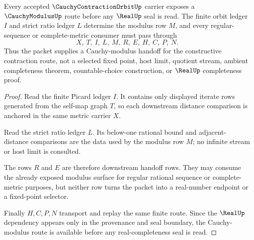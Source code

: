\begin{theorem}
\label{thm:cauchy-contraction-orbit-cauchy-modulus-handoff}
Every accepted $\CauchyContractionOrbitUp$ carrier exposes a $\CauchyModulusUp$ route before any $\RealUp$ seal is read. The finite orbit ledger $I$ and strict ratio ledger $L$ determine the modulus row $M$, and every regular-sequence or complete-metric consumer must pass through
$$
X,\ T,\ I,\ L,\ M,\ R,\ E,\ H,\ C,\ P,\ N.
$$
Thus the packet supplies a Cauchy-modulus handoff for the constructive contraction route, not a selected fixed point, host limit, quotient stream, ambient completeness theorem, countable-choice construction, or $\RealUp$ completeness proof.
\end{theorem}
\begin{proof}
Read the finite Picard ledger $I$. It contains only displayed iterate rows generated from the self-map graph $T$, so each downstream distance comparison is anchored in the same metric carrier $X$.

Read the strict ratio ledger $L$. Its below-one rational bound and adjacent-distance comparisons are the data used by the modulus row $M$; no infinite stream or host limit is consulted.

The rows $R$ and $E$ are therefore downstream handoff rows. They may consume the already exposed modulus surface for regular rational sequence or complete-metric purposes, but neither row turns the packet into a real-number endpoint or a fixed-point selector.

Finally $H,C,P,N$ transport and replay the same finite route. Since the $\RealUp$ dependency appears only in the provenance and seal boundary, the Cauchy-modulus route is available before any real-completeness seal is read.
\end{proof}



